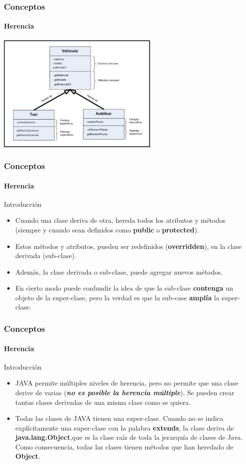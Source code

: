 \documentclass{beamer}
\begin{document}
		\begin{frame}
			\frametitle{Conceptos}
			\framesubtitle{Herencia}

			\begin{center}
				\includegraphics[width=8cm]{images/herencia_2.pdf}
			\end{center}
		\end{frame}

		\begin{frame}
			\frametitle{Conceptos}
			\framesubtitle{Herencia}

			\begin{block}{Introducci\'on}
				\begin{itemize}
  					\item Cuando una clase deriva de otra, hereda todos los atributos y m\'etodos (siempre y cuando sean definidos como \textbf{public} o \textbf{protected}).
					\item Estos m\'etodos y atributos, pueden ser redefinidos (\textbf{overridden}), en la clase derivada (sub-clase).
					\item Adem\'as, la clase derivada o sub-clase, puede agregar nuevos m\'etodos.
					\item En cierto modo puede confundir la idea de que la sub-clase \textbf{contenga} un objeto de la super-clase, pero la verdad es que la sub-case \textbf{ampl\'ia} la super-clase.
				\end{itemize}
			\end{block}
		\end{frame}

		\begin{frame}
			\frametitle{Conceptos}
			\framesubtitle{Herencia}

			\begin{block}{Introducci\'on}
				\begin{itemize}
  					\item JAVA permite m\'ultiples niveles de herencia, pero no permite que una clase derive de varias (\textbf{{\em no es posible la herencia m\'ultiple}}). Se pueden crear tantas clases derivadas de una misma clase como se quiera.
					\item Todas las clases de JAVA tienen una super-clase. Cuando no se indica expl\'icitamente una super-clase con la palabra  \textbf{extends}, la clase deriva de  \textbf{java.lang.Object},que es la clase ra\'iz de toda la jerarqu\'ia de clases de Java. Como consecuencia, todas las clases tienen m\'etodos que han heredado de \textbf{Object}.
				\end{itemize}
			\end{block}
		\end{frame}
\end{document}
